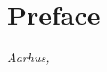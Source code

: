 \chapter*{Preface}


\bigskip
\bigskip
\bigskip
\bigskip
\bigskip
\bigskip
	 
\noindent\textit{Aarhus, \handInMonth \the\year}
\hfill \student
